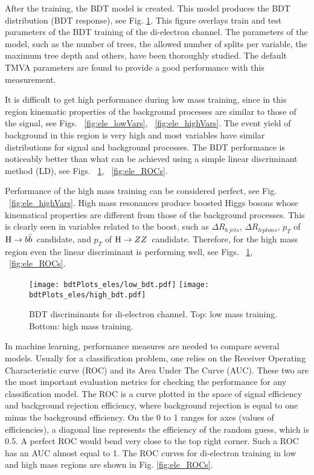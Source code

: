 After the training, the BDT model is created. This model produces the BDT distribution (BDT response), see Fig. \ref{fig:ele_BDTs}. This figure overlays train and test parameters of the BDT training of the di-electron channel. The parameters of the model, such as the number of trees, the allowed number of splits per variable, the maximum tree depth and others, have been thoroughly studied. The default TMVA parameters are found to provide a good performance with this measurement. 

It is difficult to get high performance during low mass training, since
in this region kinematic properties of the background processes are similar to those of the signal, see Figs. ~\ref{fig:ele_lowVars}, ~\ref{fig:ele_highVars}. The event yield of background in this region is very high and most variables have similar distributions for signal and background processes. The BDT performance is noticeably better than what can be achieved using a simple linear discriminant method (LD), see Figs. ~\ref{fig:ele_BDTs}, ~\ref{fig:ele_ROCs}.

Performance of the high mass training can be considered perfect, see Fig. ~\ref{fig:ele_highVars}. High mass resonances produce boosted Higgs bosons whose kinematical properties are different from those of the background processes. This is clearly seen in variables related to the boost, such as $\Delta R_{b\ jets}$, $\Delta R_{leptons}$, $p_T$ of $\mathrm{H}\to b\bar{b}$~candidate, and $p_T$ of $\mathrm{H}\rightarrow ZZ$~candidate. Therefore, for the high mass region even the linear
discriminant is performing well, see Figs. ~\ref{fig:ele_BDTs}, ~\ref{fig:ele_ROCs}.

\begin{figure}[H]
\begin{center}
\texttt{[image: bdtPlots\_eles/low\_bdt.pdf]}
\texttt{[image: bdtPlots\_eles/high\_bdt.pdf]}
\caption[BDT discriminants for di-electron channel.]{ BDT discriminants for di-electron channel. Top: low mass training. Bottom: high mass training. }
\label{fig:ele_BDTs}
\end{center}
\end{figure}

In machine learning, performance measures are needed to compare several models. Usually for a classification problem, one relies on the Receiver Operating Characteristic curve (ROC) and its Area Under The Curve (AUC). These two are the most important evaluation metrics for checking the performance for any classification model. The ROC is a curve plotted in the space of signal efficiency and background rejection efficiency, where background rejection is equal to one minus the background efficiency. On the 0 to 1 ranges for axes (values of efficiencies), a diagonal line represents the efficiency of the random guess, which is 0.5. A perfect ROC would bend very close to the top right corner. Such a ROC has an AUC almost equal to 1. The ROC curves for di-electron training in low and high mass regions are shown in Fig. \ref{fig:ele_ROCs}. 


